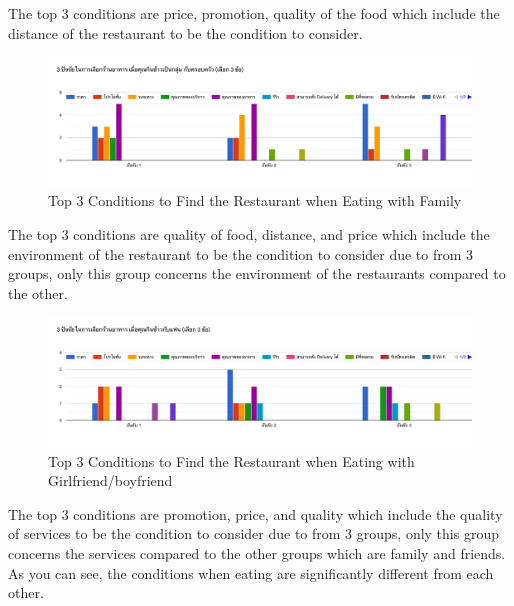 \documentclass[12pt,oneside,openright,a4paper]{cpe-english-project}
\begin{document}
The top 3 conditions are price, promotion, quality of the food which include the distance of the restaurant to be the condition to consider.

\begin{figure}[H]\centering
\includegraphics[width=350pt]{./images/A1Top3ConditionstoFindtheRestaurantwhenEatingwithFamily.png}
\caption{Top 3 Conditions to Find the Restaurant when Eating with Family}\label{fig:A1Top3ConditionstoFindtheRestaurantwhenEatingwithFamily}
\end{figure}

The top 3 conditions are quality of food, distance, and price which include the environment of the restaurant to be the condition to consider due to from 3 groups, only this group concerns the environment of the restaurants compared to the other.

\begin{figure}[H]\centering
\includegraphics[width=350pt]{./images/A1Top3ConditionstoFindtheRestaurantwhenEatingwithGirlfriend.png}
\caption{Top 3 Conditions to Find the Restaurant when Eating with Girlfriend/boyfriend}\label{fig:A1Top3ConditionstoFindtheRestaurantwhenEatingwithGirlfriend}
\end{figure}

The top 3 conditions are promotion, price, and quality which include the quality of services to be the condition to consider due to from 3 groups, only this group concerns the services compared to the other groups which are family and friends. As you can see, the conditions when eating are significantly different from each other.
\end{document}
